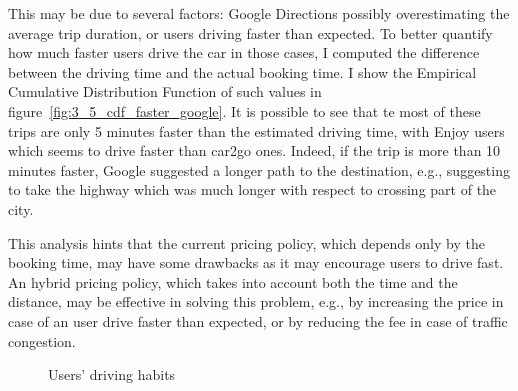 This may be due to several factors: Google Directions possibly overestimating the average trip duration, or users driving faster than expected.
To better quantify how much faster users drive the car in those cases, I  computed the difference between the driving time and the actual booking time. I show the Empirical Cumulative Distribution Function of such values in figure~\ref{fig:3_5_cdf_faster_google}. It is possible to see that te most of these trips are only 5 minutes faster than the estimated driving time, with Enjoy users which seems to drive faster than car2go ones. Indeed, if the trip is more than 10 minutes faster, Google suggested a longer path to the destination, e.g., suggesting to take the highway which was much longer with respect to crossing part of the city.

This analysis hints that the current pricing policy, which depends only by the booking time, may have some drawbacks as it may encourage users to drive fast. An hybrid pricing policy, which takes into account both the time and the distance, may be effective in solving this problem, e.g., by increasing the price in case of an user drive faster than expected, or by reducing the fee in case of traffic congestion.



\begin{figure}[t!]
\centering     %
{}
\caption{Users' driving habits}
\end{figure}


